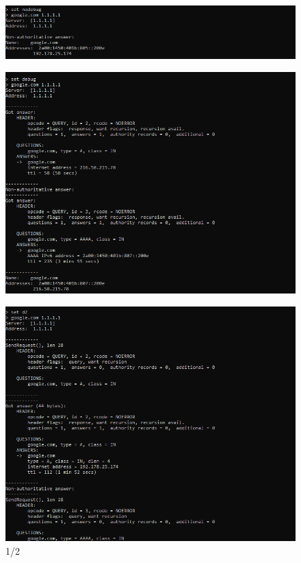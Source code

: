 \documentclass{article}
\begin{document}
\begin{normalsize}
\begin{figure}[H]
	\centering
	\includegraphics{32}
	\caption{}
\end{figure}

\begin{figure}[H]
	\centering
	\includegraphics{33}
	\caption{}
\end{figure}

\begin{figure}[H]
	\centering
	\includegraphics{34}
	\caption{1/2}
\end{figure}


\end{normalsize}
\end{document}
